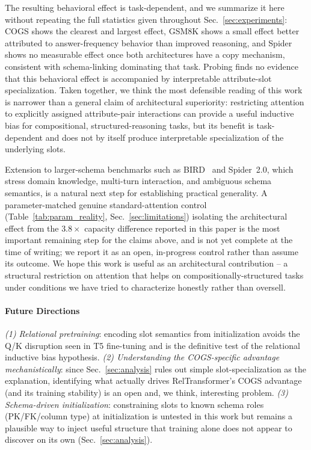 \documentclass[review]{elsarticle}
\begin{document}
The resulting behavioral effect is task-dependent, and we summarize it here without repeating the full statistics given throughout Sec.~\ref{sec:experiments}: COGS shows the clearest and largest effect, GSM8K shows a small effect better attributed to answer-frequency behavior than improved reasoning, and Spider shows no measurable effect once both architectures have a copy mechanism, consistent with schema-linking dominating that task. Probing finds no evidence that this behavioral effect is accompanied by interpretable attribute-slot specialization. Taken together, we think the most defensible reading of this work is narrower than a general claim of architectural superiority: restricting attention to explicitly assigned attribute-pair interactions can provide a useful inductive bias for compositional, structured-reasoning tasks, but its benefit is task-dependent and does not by itself produce interpretable specialization of the underlying slots.

Extension to larger-schema benchmarks such as BIRD~\cite{li2023bird} and Spider~2.0, which stress domain knowledge, multi-turn interaction, and ambiguous schema semantics, is a natural next step for establishing practical generality. A parameter-matched genuine standard-attention control (Table~\ref{tab:param_reality}, Sec.~\ref{sec:limitations}) isolating the architectural effect from the $3.8\times$ capacity difference reported in this paper is the most important remaining step for the claims above, and is not yet complete at the time of writing; we report it as an open, in-progress control rather than assume its outcome. We hope this work is useful as an architectural contribution -- a structural restriction on attention that helps on compositionally-structured tasks under conditions we have tried to characterize honestly rather than oversell.

\paragraph{Future Directions}
\emph{(1) Relational pretraining}: encoding slot semantics from initialization avoids the Q/K disruption seen in T5 fine-tuning and is the definitive test of the relational inductive bias hypothesis. \emph{(2) Understanding the COGS-specific advantage mechanistically}: since Sec.~\ref{sec:analysis} rules out simple slot-specialization as the explanation, identifying what actually drives RelTransformer's COGS advantage (and its training stability) is an open and, we think, interesting problem. \emph{(3) Schema-driven initialization}: constraining slots to known schema roles (PK/FK/column type) at initialization is untested in this work but remains a plausible way to inject useful structure that training alone does not appear to discover on its own (Sec.~\ref{sec:analysis}).
\end{document}
